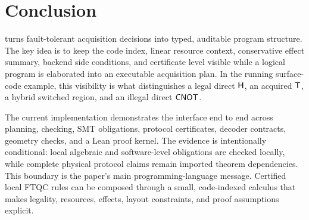 \section{Conclusion}

\system turns fault-tolerant acquisition decisions into typed, auditable program structure.
The key idea is to keep the code index, linear resource context, conservative effect summary, backend side conditions, and certificate level visible while a logical program is elaborated into an executable acquisition plan.
In the running surface-code example, this visibility is what distinguishes a legal direct $\mathsf{H}$, an acquired $\mathsf{T}$, a hybrid switched region, and an illegal direct $\mathsf{CNOT}$.

The current implementation demonstrates the interface end to end across planning, checking, SMT obligations, protocol certificates, decoder contracts, geometry checks, and a Lean proof kernel.
The evidence is intentionally conditional: local algebraic and software-level obligations are checked locally, while complete physical protocol claims remain imported theorem dependencies.
This boundary is the paper's main programming-language message.
Certified local FTQC rules can be composed through a small, code-indexed calculus that makes legality, resources, effects, layout constraints, and proof assumptions explicit.

